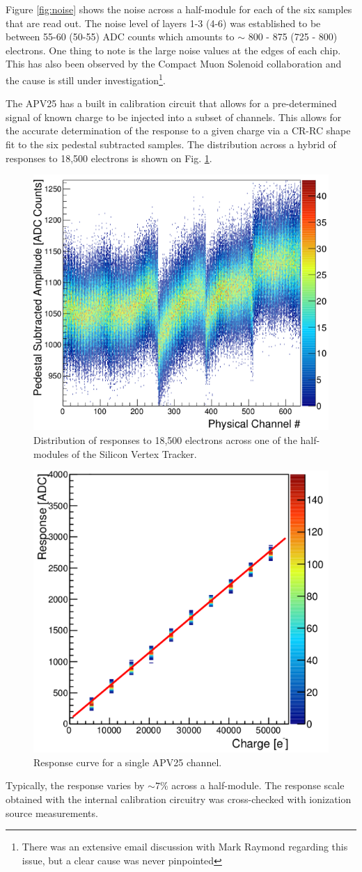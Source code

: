 Figure \ref{fig:noise} shows the noise across a half-module for each of the 
six samples that are read out.
The noise level of layers 1-3 (4-6) was established
to be between 55-60 (50-55) ADC counts which amounts to $\sim$ 800 - 875 (725 - 800) 
electrons. One thing to note is the large noise values at
the edges of each chip.  This has also been observed by the Compact Muon
Solenoid collaboration
and the cause is still under investigation\footnote{There was an extensive email
discussion with Mark Raymond regarding this issue, but a clear cause was never
pinpointed}. 

The APV25 has a built in calibration circuit that allows for a 
pre-determined signal of known charge to be injected into a subset of channels.
This allows for the accurate determination of the response to a given charge 
via a CR-RC shape fit
to the six pedestal subtracted samples.  The distribution across a hybrid 
of responses to 18,500 electrons is shown on Fig. \ref{fig:response}.
\begin{figure}[h!t]
    \centering
    \includegraphics[width=.6\textwidth]{images/response.png}
    \caption{Distribution of responses to 18,500 electrons across one of the 
             half-modules of the Silicon Vertex Tracker.}
    \label{fig:response}
\end{figure}
\begin{figure}[h!b]
    \centering
    \includegraphics[width=.6\textwidth]{images/response_curve.png}
    \caption{Response curve for a single APV25 channel.}
    \label{fig:response_curve}
\end{figure}
Typically, the response varies by $\sim 7$\% across a half-module. 
The response scale obtained with
the internal calibration circuitry was cross-checked with ionization source
measurements.  

